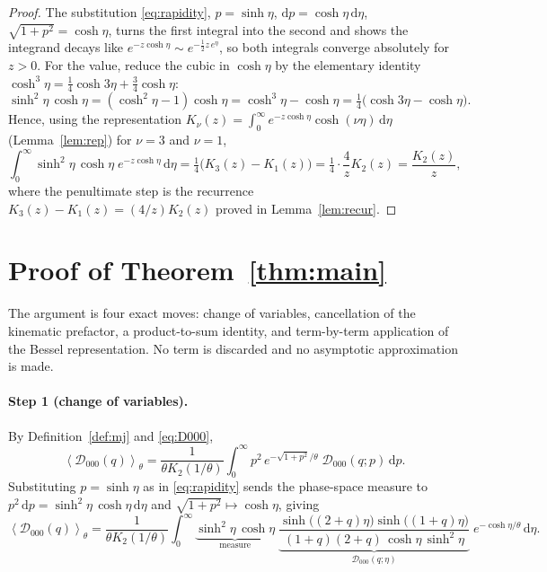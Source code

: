 \documentclass[11pt]{article}
\theoremstyle{definition}
\theoremstyle{remark}
\newcommand{\dd}{\mathrm{d}}
\newcommand{\Do}{\mathcal{D}}
\newcommand{\avg}[1]{\left\langle #1 \right\rangle}
\begin{document}
\begin{proof}
The substitution \eqref{eq:rapidity}, $p=\sinh\eta$, $\dd p=\cosh\eta\,\dd\eta$, $\sqrt{1+p^2}=\cosh\eta$, turns
the first integral into the second and shows the integrand decays like $e^{-z\cosh\eta}\sim e^{-\tfrac12 z\,e^{\eta}}$,
so both integrals converge absolutely for $z>0$. For the value, reduce the cubic in $\cosh\eta$ by the elementary
identity $\cosh^3\eta=\tfrac14\cosh3\eta+\tfrac34\cosh\eta$:
\begin{equation}
  \sinh^2\eta\,\cosh\eta=(\cosh^2\eta-1)\cosh\eta=\cosh^3\eta-\cosh\eta
  =\tfrac14\big(\cosh3\eta-\cosh\eta\big).
  \label{eq:cubic}
\end{equation}
Hence, using the representation $K_\nu(z)=\int_0^\infty e^{-z\cosh\eta}\cosh(\nu\eta)\,\dd\eta$
(Lemma~\ref{lem:rep}) for $\nu=3$ and $\nu=1$,
\begin{equation}
  \int_0^\infty \sinh^2\eta\,\cosh\eta\;e^{-z\cosh\eta}\,\dd\eta
  =\tfrac14\big(K_3(z)-K_1(z)\big)
  =\tfrac14\cdot\frac{4}{z}K_2(z)=\frac{K_2(z)}{z},
\end{equation}
where the penultimate step is the recurrence $K_3(z)-K_1(z)=(4/z)K_2(z)$ proved in Lemma~\ref{lem:recur}.
\end{proof}

\section{Proof of Theorem~\ref{thm:main}}
\label{sec:proof}

The argument is four exact moves: change of variables, cancellation of the kinematic prefactor, a
product-to-sum identity, and term-by-term application of the Bessel representation. No term is discarded and no
asymptotic approximation is made.

\paragraph{Step 1 (change of variables).}
By Definition~\ref{def:mj} and \eqref{eq:D000},
\begin{equation}
  \avg{\Do_{000}(q)}_\theta
  =\frac{1}{\theta K_2(1/\theta)}\int_0^\infty
     p^2\,e^{-\sqrt{1+p^2}/\theta}\;\Do_{000}(q;p)\,\dd p .
\end{equation}
Substituting $p=\sinh\eta$ as in \eqref{eq:rapidity} sends the phase-space measure to
$p^2\,\dd p=\sinh^2\eta\,\cosh\eta\,\dd\eta$ and $\sqrt{1+p^2}\mapsto\cosh\eta$, giving
\begin{equation}
  \avg{\Do_{000}(q)}_\theta
  =\frac{1}{\theta K_2(1/\theta)}\int_0^\infty
    \underbrace{\sinh^2\eta\,\cosh\eta}_{\text{measure}}\;
    \underbrace{\frac{\sinh\!\big((2+q)\eta\big)\sinh\!\big((1+q)\eta\big)}
                     {(1+q)(2+q)\,\cosh\eta\,\sinh^2\eta}}_{\Do_{000}(q;\eta)}
    \;e^{-\cosh\eta/\theta}\,\dd\eta .
  \label{eq:step1}
\end{equation}
\end{document}
